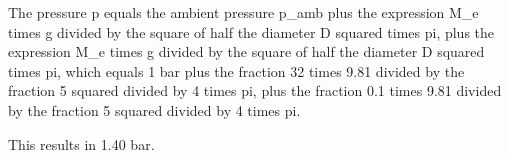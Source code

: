 The pressure p equals the ambient pressure p_amb plus the expression M_e times g divided by the square of half the diameter D squared times pi, plus the expression M_e times g divided by the square of half the diameter D squared times pi, which equals 1 bar plus the fraction 32 times 9.81 divided by the fraction 5 squared divided by 4 times pi, plus the fraction 0.1 times 9.81 divided by the fraction 5 squared divided by 4 times pi.

This results in 1.40 bar.